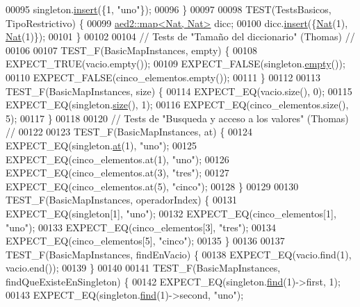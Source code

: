 \begin{DoxyCode}
00095     singleton.\hyperlink{classaed2_1_1map_a60aacba06b1579630b3c8e996cf248c8_a60aacba06b1579630b3c8e996cf248c8}{insert}(\{1, \textcolor{stringliteral}{"uno"}\});
00096 \}
00097 
00098 TEST(TestsBasicos, TipoRestrictivo) \{
00099     \hyperlink{classaed2_1_1map}{aed2::map<Nat, Nat>} dicc;
00100     dicc.\hyperlink{classaed2_1_1map_a60aacba06b1579630b3c8e996cf248c8_a60aacba06b1579630b3c8e996cf248c8}{insert}(\{\hyperlink{classNat}{Nat}(1), \hyperlink{classNat}{Nat}(1)\});
00101 \}
00102 
00104 \textcolor{comment}{// Tests de "Tamaño del diccionario" (Thomas) //}
00106 \textcolor{comment}{}
00107 TEST\_F(BasicMapInstances, empty) \{
00108     EXPECT\_TRUE(vacio.empty());
00109     EXPECT\_FALSE(singleton.\hyperlink{classaed2_1_1map_a0dcb39283f4877ae59cb756ed1d0c048_a0dcb39283f4877ae59cb756ed1d0c048}{empty}());
00110     EXPECT\_FALSE(cinco\_elementos.empty());
00111 \}
00112 
00113 TEST\_F(BasicMapInstances, size) \{
00114     EXPECT\_EQ(vacio.size(), 0);
00115     EXPECT\_EQ(singleton.\hyperlink{classaed2_1_1map_aa6e806b3be6dc0da79adbfae08b571bf_aa6e806b3be6dc0da79adbfae08b571bf}{size}(), 1);
00116     EXPECT\_EQ(cinco\_elementos.size(), 5);
00117 \}
00118 
00120 \textcolor{comment}{// Tests de "Busqueda y acceso a los valores" (Thomas) //}
00122 \textcolor{comment}{}
00123 TEST\_F(BasicMapInstances, at) \{
00124     EXPECT\_EQ(singleton.\hyperlink{classaed2_1_1map_a579c9179b42175c23a1013ac7f1b876c_a579c9179b42175c23a1013ac7f1b876c}{at}(1), \textcolor{stringliteral}{"uno"});
00125     EXPECT\_EQ(cinco\_elementos.at(1), \textcolor{stringliteral}{"uno"});
00126     EXPECT\_EQ(cinco\_elementos.at(3), \textcolor{stringliteral}{"tres"});
00127     EXPECT\_EQ(cinco\_elementos.at(5), \textcolor{stringliteral}{"cinco"});
00128 \}
00129 
00130 TEST\_F(BasicMapInstances, operadorIndex) \{
00131     EXPECT\_EQ(singleton[1], \textcolor{stringliteral}{"uno"});
00132     EXPECT\_EQ(cinco\_elementos[1], \textcolor{stringliteral}{"uno"});
00133     EXPECT\_EQ(cinco\_elementos[3], \textcolor{stringliteral}{"tres"});
00134     EXPECT\_EQ(cinco\_elementos[5], \textcolor{stringliteral}{"cinco"});
00135 \}
00136 
00137 TEST\_F(BasicMapInstances, findEnVacio) \{
00138     EXPECT\_EQ(vacio.find(1), vacio.end());
00139 \}
00140 
00141 TEST\_F(BasicMapInstances, findQueExisteEnSingleton) \{
00142     EXPECT\_EQ(singleton.\hyperlink{classaed2_1_1map_afd0fc1a8234888e61e0e615de7e245b8_afd0fc1a8234888e61e0e615de7e245b8}{find}(1)->first, 1);
00143     EXPECT\_EQ(singleton.\hyperlink{classaed2_1_1map_afd0fc1a8234888e61e0e615de7e245b8_afd0fc1a8234888e61e0e615de7e245b8}{find}(1)->second, \textcolor{stringliteral}{"uno"});

\end{DoxyCode}
